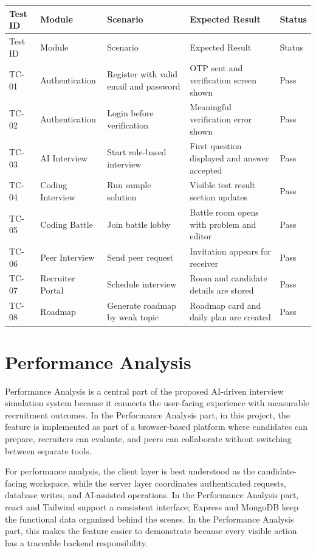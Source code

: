 \documentclass[12pt,a4paper]{report}
\begin{document}
\begin{longtable}{|>{\raggedright\arraybackslash}p{}|>{\raggedright\arraybackslash}p{}|>{\raggedright\arraybackslash}p{}|>{\raggedright\arraybackslash}p{}|>{\raggedright\arraybackslash}p{}|}
\hline
Test ID & Module & Scenario & Expected Result & Status \\
\hline
\endfirsthead
\hline
Test ID & Module & Scenario & Expected Result & Status \\
\hline
\endhead
TC-01 & Authentication & Register with valid email and password & OTP sent and verification screen shown & Pass \\
\hline
TC-02 & Authentication & Login before verification & Meaningful verification error shown & Pass \\
\hline
TC-03 & AI Interview & Start role-based interview & First question displayed and answer accepted & Pass \\
\hline
TC-04 & Coding Interview & Run sample solution & Visible test result section updates & Pass \\
\hline
TC-05 & Coding Battle & Join battle lobby & Battle room opens with problem and editor & Pass \\
\hline
TC-06 & Peer Interview & Send peer request & Invitation appears for receiver & Pass \\
\hline
TC-07 & Recruiter Portal & Schedule interview & Room and candidate details are stored & Pass \\
\hline
TC-08 & Roadmap & Generate roadmap by weak topic & Roadmap card and daily plan are created & Pass \\
\hline
\end{longtable}

\section{Performance Analysis}

Performance Analysis is a central part of the proposed AI-driven interview simulation system because it connects the user-facing experience with measurable recruitment outcomes. In the Performance Analysis part, in this project, the feature is implemented as part of a browser-based platform where candidates can prepare, recruiters can evaluate, and peers can collaborate without switching between separate tools.


For performance analysis, the client layer is best understood as the candidate-facing workspace, while the server layer coordinates authenticated requests, database writes, and AI-assisted operations. In the Performance Analysis part, react and Tailwind support a consistent interface; Express and MongoDB keep the functional data organized behind the scenes. In the Performance Analysis part, this makes the feature easier to demonstrate because every visible action has a traceable backend responsibility.
\end{document}
